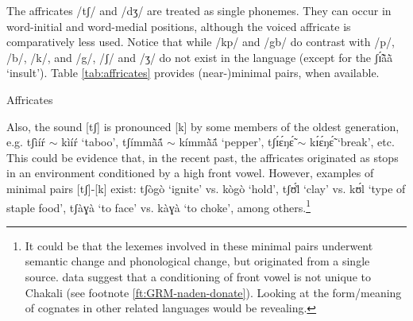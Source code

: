 The affricates /{tʃ}/ and  /{dʒ}/ are  treated as single phonemes. 
They can occur in word-initial and word-medial positions, although the voiced 
affricate is comparatively less used. Notice that while  /{kp}/ and /{gb}/ do contrast with /{p}/, /{b}/,  /{k}/,  and /{g}/,   
/{ʃ}/ and  /{ʒ}/ do not exist in the language (except for the  
{\sls ʃɪ̃́ã̀ã̀}  `insult').  Table \ref{tab:affricates} provides (near-)minimal  
pairs, when available. 


\begin{table} 

\caption{Affricates\label{tab:affricates}}

\quad
{}
\end{table}

Also, the sound [{tʃ}] is pronounced [{k}]  by some members of the 
oldest generation, e.g. {\sls tʃìíŕ} $\sim$ {\sls kìíŕ} `taboo',   {\sls 
tʃímmã̀ã́} $\sim$ {\sls kímmã̀ã́} `pepper',  {\sls tʃɪ́ɛ́ŋɛ̃́} $\sim$  {\sls kɪ́ɛ́ŋɛ̃́} `break', etc.  This could be evidence that, in the  recent past, the affricates originated as  stops in an environment conditioned by a high front vowel.  However, examples of minimal pairs [{tʃ}]-[{k}] exist:  {\sls tʃògò}  `ignite' vs. {\sls kògò} `hold', {\sls tʃʊ́l̀} `clay' vs.  {\sls kʊ́l} `type of 
staple food',  {\sls tʃàɣà} `to face'  vs.  {\sls kàɣà} `to choke',  among 
others.\footnote{It could be that the lexemes involved in these minimal pairs 
underwent semantic change and phonological change, but originated from a single 
source.   data suggest that a conditioning of front vowel is 
not unique to Chakali (see footnote \ref{ft:GRM-naden-donate}). Looking at the form/meaning of cognates in other related languages would be revealing.}

